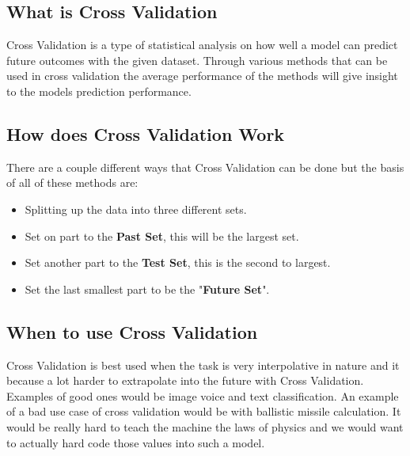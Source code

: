 \subsection{What is Cross Validation}
Cross Validation is a type of statistical analysis on how well a model can predict future outcomes with the given dataset. Through various methods that can be used in cross validation the average performance of the methods will give insight to the models prediction performance.
\subsection{How does Cross Validation Work}
There are a couple different ways that Cross Validation can be done but the basis of all of these methods are: 
\begin{itemize}
	\item Splitting up the data into three different sets.
	\item Set on part to the \textbf{Past Set}, this will be the largest set.  
	\item Set another part to the \textbf{Test Set}, this is the second to largest. 
	\item Set the last smallest part to be the "\textbf{Future Set}". 
\end{itemize}
\subsection{When to use Cross Validation}
Cross Validation is best used when the task is very interpolative in nature and it because a lot harder to extrapolate into the future with Cross Validation. Examples of good ones would be image voice and text classification. An example of a bad use case of cross validation would be with ballistic missile calculation. It would be really hard to teach the machine the laws of physics and we would want to actually hard code those values into such a model.
